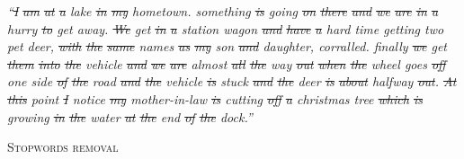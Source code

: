 \begin{minipage}[t]{\textwidth}
\begin{minipage}[t]{0.75\textwidth}
    \begin{spacing}{0.5}
    {\scriptsize \it
    ``\sout{I} \sout{am} \sout{at} \sout{a} {\color{orangeUnicam}lake} \sout{in} \sout{my} {\color{orangeUnicam}\color{orangeUnicam} hometown}.
    {\color{orangeUnicam}something} \sout{is} {\color{orangeUnicam}going} \sout{on} \sout{there} \sout{and} \sout{we} \sout{are} \sout{in}
    \sout{a} {\color{orangeUnicam}hurry} \sout{to} {\color{orangeUnicam}get} {\color{orangeUnicam}away}.
    \sout{We} {\color{orangeUnicam}get} \sout{in} \sout{a} {\color{orangeUnicam}station} {\color{orangeUnicam}wagon} \sout{and} \sout{have} \sout{a}
    {\color{orangeUnicam}hard} {\color{orangeUnicam}time} {\color{orangeUnicam}getting} {\color{orangeUnicam}two} {\color{orangeUnicam}pet} {\color{orangeUnicam}deer}, \sout{with} \sout{the}
    \sout{same} {\color{orangeUnicam}names} \sout{as} \sout{my} {\color{orangeUnicam}son} \sout{and} {\color{orangeUnicam}daughter}, {\color{orangeUnicam}corralled}.
    {\color{orangeUnicam}finally} \sout{we} {\color{orangeUnicam}get} \sout{them} \sout{into} \sout{the} {\color{orangeUnicam}vehicle} \sout{and} \sout{we}
    \sout{are} {\color{orangeUnicam}almost} \sout{all} \sout{the} {\color{orangeUnicam}way} \sout{out} \sout{when} \sout{the} {\color{orangeUnicam}wheel}
    {\color{orangeUnicam}goes} \sout{off} {\color{orangeUnicam}one} {\color{orangeUnicam}side} \sout{of} \sout{the} {\color{orangeUnicam}road}
    \sout{and} \sout{the} {\color{orangeUnicam}vehicle} \sout{is} {\color{orangeUnicam}stuck} \sout{and} \sout{the} {\color{orangeUnicam}deer} \sout{is}
    \sout{about} {\color{orangeUnicam}halfway} \sout{out}.
    \sout{At} \sout{this} {\color{orangeUnicam}point} \sout{I} {\color{orangeUnicam}notice} \sout{my} {\color{orangeUnicam}mother-in-law} \sout{is}
    {\color{orangeUnicam}cutting} \sout{off} \sout{a} {\color{orangeUnicam}christmas} {\color{orangeUnicam}tree} \sout{which} \sout{is} {\color{orangeUnicam}growing}
    \sout{in} \sout{the} {\color{orangeUnicam}water} \sout{at} \sout{the} {\color{orangeUnicam}end} \sout{of} \sout{the} {\color{orangeUnicam}dock}.''}
    \end{spacing}
\end{minipage}
\hfill
    \begin{minipage}[t]{0.23\textwidth}
        \centering
        {\color{orangeUnicam} \scshape \small Stopwords removal}
    \end{minipage}
\end{minipage}
